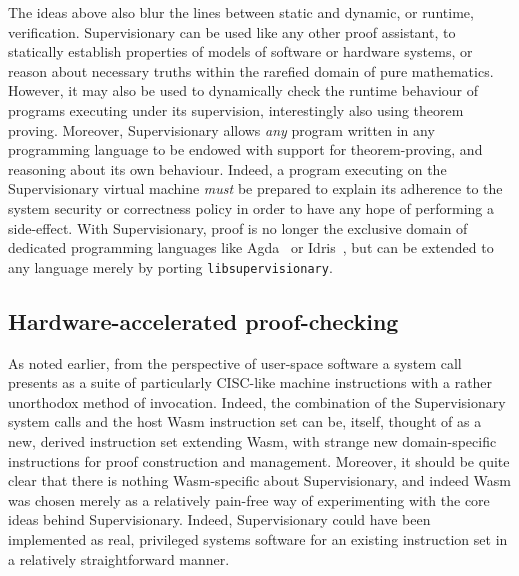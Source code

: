 \documentclass[a4paper, UKenglish, cleveref, autoref, thm-restate, colorlinks]{lipics-v2021}
\begin{document}
The ideas above also blur the lines between static and dynamic, or runtime, verification.
Supervisionary can be used like any other proof assistant, to statically establish properties of models of software or hardware systems, or reason about necessary truths within the rarefied domain of pure mathematics.
However, it may also be used to dynamically check the runtime behaviour of programs executing under its supervision, interestingly also using theorem proving.
Moreover, Supervisionary allows \emph{any} program written in any programming language to be endowed with support for theorem-proving, and reasoning about its own behaviour.
Indeed, a program executing on the Supervisionary virtual machine \emph{must} be prepared to explain its adherence to the system security or correctness policy in order to have any hope of performing a side-effect.
With Supervisionary, proof is no longer the exclusive domain of dedicated programming languages like Agda~\cite{DBLP:conf/icfp/Norell13} or Idris~\cite{DBLP:conf/ecoop/Brady21, DBLP:journals/jfp/Brady13}, but can be extended to any language merely by porting \texttt{libsupervisionary}.

\subsection{Hardware-accelerated proof-checking}
\label{subsect.hardware-accelerated.proof-checking}

As noted earlier, from the perspective of user-space software a system call presents as a suite of particularly CISC-like machine instructions with a rather unorthodox method of invocation.
Indeed, the combination of the Supervisionary system calls and the host Wasm instruction set can be, itself, thought of as a new, derived instruction set extending Wasm, with strange new domain-specific instructions for proof construction and management.
Moreover, it should be quite clear that there is nothing Wasm-specific about Supervisionary, and indeed Wasm was chosen merely as a relatively pain-free way of experimenting with the core ideas behind Supervisionary.
Indeed, Supervisionary could have been implemented as real, privileged systems software for an existing instruction set in a relatively straightforward manner.
\end{document}
